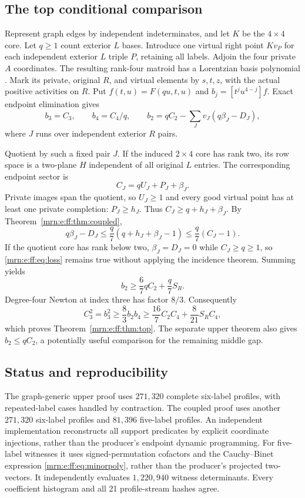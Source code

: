 \documentclass[11pt,a4paper]{article}
\theoremstyle{remark}\newtheorem{remark}[theorem]{Remark}
\begin{document}
\subsection{The top conditional comparison}
Represent graph edges by independent indeterminates, and let $K$ be the $4\times4$ core. Let $q\ge1$ count exterior $L$ bases. Introduce one virtual right point $Kv_P$ for each independent exterior $L$ triple $P$, retaining all labels. Adjoin the four private $A$ coordinates. The resulting rank-four matroid has a Lorentzian basis polynomial \cite{b:BH}. Mark its private, original $R$, and virtual elements by $s,t,z$, with the actual positive activities on $R$. Put $f(t,u)=F(qu,t,u)$ and $b_j=[t^ju^{4-j}]f$. Exact endpoint elimination gives
\[
 b_3=C_3,\qquad b_4=C_4/q,\qquad
 b_2=qC_2-\sum_Jv_J(q\beta_J-D_J),
\]
where $J$ runs over independent exterior $R$ pairs.

Quotient by such a fixed pair $J$. If the induced $2\times4$ core has rank two, its row space is a two-plane $H$ independent of all original $L$ entries. The corresponding endpoint sector is
\[
 C_J=qU_J+P_J+\beta_J.
\]
Private images span the quotient, so $U_J\ge1$ and every good virtual point has at least one private completion: $P_J\ge h_J$. Thus $C_J\ge q+h_J+\beta_J$. By Theorem~\ref{mrn:e:ff:thm:coupled},
\begin{equation}\label{mrn:e:ff:eq:loss}
 q\beta_J-D_J
 \le\frac q7(q+h_J+\beta_J-1)
 \le\frac q7(C_J-1).
\end{equation}
If the quotient core has rank below two, $\beta_J=D_J=0$ while $C_J\ge q\ge1$, so \eqref{mrn:e:ff:eq:loss} remains true without applying the incidence theorem. Summing yields
\[
 b_2\ge\frac67qC_2+\frac q7S_R.
\]
Degree-four Newton at index three has factor $8/3$. Consequently
\[
 C_3^2=b_3^2\ge\frac83b_2b_4
 \ge\frac{16}{7}C_2C_4+\frac8{21}S_RC_4,
\]
which proves Theorem~\ref{mrn:e:ff:thm:top}. The separate upper theorem also gives $b_2\le qC_2$, a potentially useful comparison for the remaining middle gap.

\subsection{Status and reproducibility}
The graph-generic upper proof uses $271{,}320$ complete six-label profiles, with repeated-label cases handled by contraction. The coupled proof uses another $271{,}320$ six-label profiles and $81{,}396$ five-label profiles. An independent implementation reconstructs all support predicates by explicit coordinate injections, rather than the producer's endpoint dynamic programming. For five-label witnesses it uses signed-permutation cofactors and the Cauchy--Binet expression \eqref{mrn:e:ff:eq:minorpoly}, rather than the producer's projected two-vectors. It independently evaluates $1{,}220{,}940$ witness determinants. Every coefficient histogram and all 21 profile-stream hashes agree.
\end{document}
